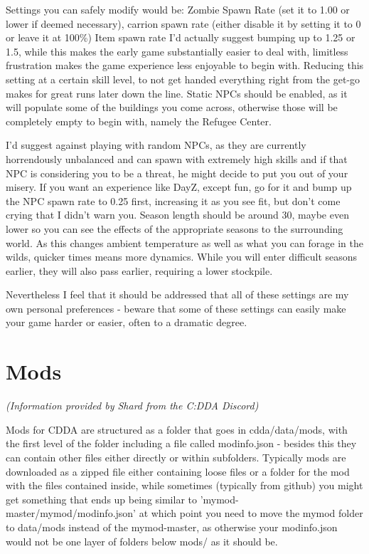 \documentclass[11pt]{report}
\begin{document}
Settings you can safely modify would be: Zombie Spawn Rate (set it to 1.00 or lower if deemed necessary), carrion spawn rate (either disable it by setting it to 0 or leave it at 100\%) Item spawn rate I'd actually suggest bumping up to 1.25 or 1.5, while this makes the early game substantially easier to deal with, limitless frustration makes the game experience less enjoyable to begin with. Reducing this setting at a certain skill level, to not get handed everything right from the get-go makes for great runs later down the line. Static NPCs should be enabled, as it will populate some of the buildings you come across, otherwise those will be completely empty to begin with, namely the Refugee Center.

I'd suggest against playing with random NPCs, as they are currently horrendously unbalanced and can spawn with extremely high skills and if that NPC is considering you to be a threat, he might decide to put you out of your misery. If you want an experience like DayZ, except fun, go for it and bump up the NPC spawn rate to 0.25 first, increasing it as you see fit, but don't come crying that I didn't warn you.
Season length should be around 30, maybe even lower so you can see the effects of the appropriate seasons to the surrounding world. As this changes ambient temperature as well as what you can forage in the wilds, quicker times means more dynamics. While you will enter difficult seasons earlier, they will also pass earlier, requiring a lower stockpile.

Nevertheless I feel that it should be addressed that all of these settings are my own personal preferences - beware that some of these settings can easily make your game harder or easier, often to a dramatic degree.

\section{Mods}

\textit{(Information provided by Shard from the C:DDA Discord)}

Mods for CDDA are structured as a folder that goes in cdda/data/mods, with the first level of the folder including a file called modinfo.json - besides this they can contain other files either directly or within subfolders.  Typically mods are downloaded as a zipped file either containing loose files or a folder for the mod with the files contained inside, while sometimes (typically from github) you might get something that ends up being similar to 'mymod-master/mymod/modinfo.json' at which point you need to move the mymod folder to data/mods instead of the mymod-master, as otherwise your modinfo.json would not be one layer of folders below mods/ as it should be.
\end{document}
